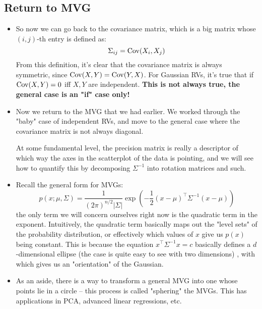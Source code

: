 \subsection{Return to MVG}
\begin{itemize}
	\item So now we can go back to the covariance matrix, which is a big matrix whose
		\( (i, j) \)-th entry is defined as:
		\[
			\Sigma_{ij} = \operatorname*{Cov}(X_i, X_j)
		\]
		From this definition, it's clear that the covariance matrix is always 
		symmetric, since \( \operatorname*{Cov}(X, Y) = \operatorname*{Cov}(Y, X) \). For Gaussian RVs, it's true
		that if \( \operatorname*{Cov}(X, Y) = 0 \) iff \( X, Y \) are independent. \textbf{This is
		not always true, the general case is an "if" case only!}
	\item Now we return to the MVG that we had earlier. We worked through the "baby"
		case of independent RVs, and move to the general case where the covariance
		matrix is not always diagonal. 

		At some fundamental level, the precision matrix is really a descriptor of
		which way the axes in the scatterplot of the data is pointing, and we will
		see how to quantify this by decomposing \( \Sigma^{-1} \) into rotation
		matrices and such. 
	\item Recall the general form for MVGs:
		\[
			p(x; \mu, \Sigma) = \frac{1}{(2\pi)^{n / 2}|\Sigma|} \exp\left(
			-\frac{1}{2}(x -\mu)^{\top} \Sigma^{-1}(x - \mu) \right)
		\]
		the only term we will concern ourselves right now is the quadratic term in
		the exponent. Intuitively, the quadratic term basically maps out the "level
		sets" of the probability distribution, or effectively which values of \( x \)
		give us \( p(x) \) being constant. This is because the equation \( x^{\top}
		\Sigma^{-1} x = c \) basically defines a \( d \)-dimensional ellipse (the
		case is quite easy to see with two dimensions) , with
		which gives us an "orientation" of the Gaussian.  

	\item As an aside, there is a way to transform a general MVG into one whose
		points lie in a circle -- this process is called "sphering" the MVGs. This
		has applications in PCA, advanced linear regressions, etc. 
\end{itemize} 
